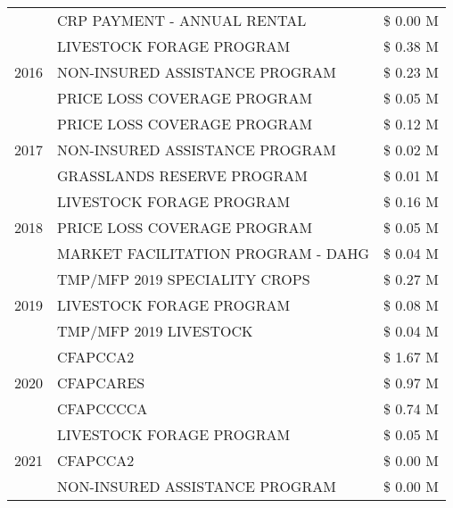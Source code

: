 \begin{tabular}{llr}
 & CRP PAYMENT - ANNUAL RENTAL & \$ 0.00 M \\
\cline{1-3}
\multirow[t]{3}{*}{2016} & LIVESTOCK FORAGE PROGRAM & \$ 0.38 M \\
 & NON-INSURED ASSISTANCE PROGRAM & \$ 0.23 M \\
 & PRICE LOSS COVERAGE PROGRAM & \$ 0.05 M \\
\cline{1-3}
\multirow[t]{3}{*}{2017} & PRICE LOSS COVERAGE PROGRAM & \$ 0.12 M \\
 & NON-INSURED ASSISTANCE PROGRAM & \$ 0.02 M \\
 & GRASSLANDS RESERVE PROGRAM & \$ 0.01 M \\
\cline{1-3}
\multirow[t]{3}{*}{2018} & LIVESTOCK FORAGE PROGRAM & \$ 0.16 M \\
 & PRICE LOSS COVERAGE PROGRAM & \$ 0.05 M \\
 & MARKET FACILITATION PROGRAM - DAHG & \$ 0.04 M \\
\cline{1-3}
\multirow[t]{3}{*}{2019} & TMP/MFP 2019 SPECIALITY CROPS & \$ 0.27 M \\
 & LIVESTOCK FORAGE PROGRAM & \$ 0.08 M \\
 & TMP/MFP 2019 LIVESTOCK & \$ 0.04 M \\
\cline{1-3}
\multirow[t]{3}{*}{2020} & CFAPCCA2 & \$ 1.67 M \\
 & CFAPCARES & \$ 0.97 M \\
 & CFAPCCCCA & \$ 0.74 M \\
\cline{1-3}
\multirow[t]{3}{*}{2021} & LIVESTOCK FORAGE PROGRAM & \$ 0.05 M \\
 & CFAPCCA2 & \$ 0.00 M \\
 & NON-INSURED ASSISTANCE PROGRAM & \$ 0.00 M \\
\cline{1-3}
\bottomrule
\end{tabular}
